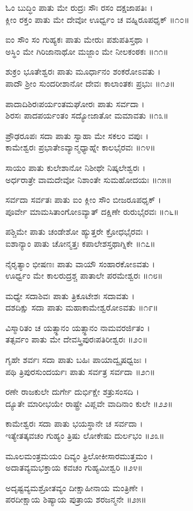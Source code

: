 ಓಂ ಬುದ್ಧಿಂ ಪಾತು ಮೇ ರುದ್ರಃ ಸೌಃ ರಸಂ ದಕ್ಷಜಾಪತಿಃ ।\\
ಕ್ಲೀಂ ರಕ್ತಂ ಪಾತು ಮೇ ದೇವೋ ಊರ್ಧ್ವಂ ಚ ವಹ್ನಿರೂಪಧೃಕ್ ॥೧೦॥

ಐಂ ಸೌಂ ಸಂ ಗುಹ್ಯಕಃ ಪಾತು ಮೇರುಃ ಪಶುಪತಿಸ್ತಥಾ ।\\
ಅಸ್ಥಿಂ ಮೇ ಗಿರಿಜಾನಾಥೋ ಮಜ್ಜಾಂ ಮೇ ನೀಲಕಂಠಕಃ ॥೧೧॥

ಶುಕ್ರಂ ಭೂತೇಶ್ವರಃ ಪಾತು ಮೂರ್ಧಾನಂ ಶಂಕರೋಽವತು ।\\
ಪಾದೌ ಶ್ರೀಂ ಸುಂದರೀಶಾನೋ ದೇವಃ ಕಾಲಾಂತಕಃ ಪ್ರಭುಃ ॥೧೨॥

ಪಾದಾದಿಶಿರಃಪರ್ಯಂತಮಘೋರಃ ಪಾತು ಸರ್ವದಾ ।\\
ಶಿರಸಃ ಪಾದಪರ್ಯಂತಂ ಸದ್ಯೋಜಾತೋ ಮಮಾವತು ॥೧೩॥

ಪ್ರೌಢರೂಪಃ ಸದಾ ಪಾತು ಸ್ವಾಹಾ ಮೇ ಸಕಲಂ ವಪುಃ ।\\
ಕಾಮೇಶ್ವರಃ ಪ್ರಭಾತೇಽವ್ಯಾನ್ಮಧ್ಯಾಹ್ನೇ ಕಾಲಭೈರವಃ ॥೧೪॥

ಸಾಯಂ ಪಾತು ಕುಲೇಶಾನೋ ನಿಶೀಥೇ ನಿಷ್ಕಲೇಶ್ವರಃ ।\\
ಅರ್ಧರಾತ್ರೇ ವಾಮದೇವೋ ನಿಶಾಂತೇ ಸುಮಹೋದಯಃ ॥೧೫॥

ಸರ್ವದಾ ಸರ್ವತಃ ಪಾತು ಐಂ ಕ್ಲೀಂ ಸೌಂ ಬೀಜರೂಪಧೃಕ್ ।\\
ಪೂರ್ವೇ ಮಾಮಸಿತಾಂಗೋಽವ್ಯಾತ್ ದಕ್ಷಿಣೇ ರುರುಭೈರವಃ ॥೧೬॥

ಪಶ್ಚಿಮೇ ಪಾತು ಚಂಡೇಶೋ ಹ್ಯುತ್ತರೇ ಕ್ರೋಧಭೈರವಃ ।\\
ಐಶಾನ್ಯಾಂ ಪಾತು ಚೋನ್ಮತ್ತಃ ಕಪಾಲೇಶಸ್ತಥಾಗ್ನಿಕೇ ॥೧೭॥

ನೈರೃತ್ಯಾಂ ಭೀಷಣಃ ಪಾತು ವಾಯೌ ಸಂಹಾರಕೋಽವತು ।\\
ಊರ್ಧ್ವಂ ಮೇ ಕಾಲರುದ್ರಶ್ಚ ಪಾತಾಲೇ ಪರಮೇಶ್ವರಃ ॥೧೮॥

ಮಧ್ಯೇ ಸದಾಶಿವಃ ಪಾತು ತ್ರಿಕೂಟೇಶಃ ಸದಾವತು ।\\
ದಶದಿಕ್ಷು ಸದಾ ಪಾತು ಮಹಾಕಾಮೇಶ್ವರೋಽವತು ॥೧೯॥

ವಿಸ್ಮಾರಿತಂ ಚ ಯತ್ಸ್ಥಾನಂ ಯತ್ಸ್ಥಾನಂ ನಾಮವರರ್ಜಿತಂ ।\\
ತತ್ಸರ್ವಂ ಪಾತು ಮೇ ದೇವಸ್ತ್ರಿಪುರಃಪತಿರೀಶ್ವರಃ ॥೨೦॥

ಗೃಹೇ ಶರ್ವಃ ಸದಾ ಪಾತು ಬಹಿಃ ಪಾಯಾದ್ವೃಷಧ್ವಜಃ ।\\
ಪಥಿ ತ್ರಿಪುರಸುಂದರ್ಯಃ ಪಾತು ಸರ್ವತ್ರ ಸರ್ವದಾ ॥೨೧॥

ರಣೇ ರಾಜಕುಲೇ ದುರ್ಗೇ ದುರ್ಭಿಕ್ಷೇ ಶತ್ರುಸಂಸದಿ ।\\
ದ್ಯೂತೇ ಮಾರೀಭಯೇ ರಾಷ್ಟ್ರೇ ವಿಪ್ಲವೇ ವಾದಿನಾಂ ಕುಲೇ ॥೨೨॥

ಕಾಮೇಶ್ವರಃ ಸದಾ ಪಾತು ಭಯಸ್ಥಾನೇ ಚ ಸರ್ವದಾ ।\\
ಇತ್ಯೇತತ್ಕವಚಂ ಗುಹ್ಯಂ ತ್ರಿಷು ಲೋಕೇಷು ದುರ್ಲಭಂ ॥೨೩॥

ಮೂಲಮಂತ್ರಮಯಂ ದಿವ್ಯಂ ತ್ರಿಲೋಕೀಸಾರಮುತ್ತಮಂ ।\\
ಅದಾತವ್ಯಮಭಕ್ತಾಯ ಕವಚಂ ಗುಹ್ಯಮೀಶ್ವರಿ ॥೨೪॥

ಅದೃಷ್ಟವ್ಯಮಶ್ರೋತವ್ಯಂ ದೀಕ್ಷಾಹೀನಾಯ ಮಂತ್ರಿಣೇ ।\\
ಪರದೀಕ್ಷಾಯ ಶಿಷ್ಯಾಯ ಪುತ್ರಾಯ ಶರಜನ್ಮನೇ ॥೨೫॥


